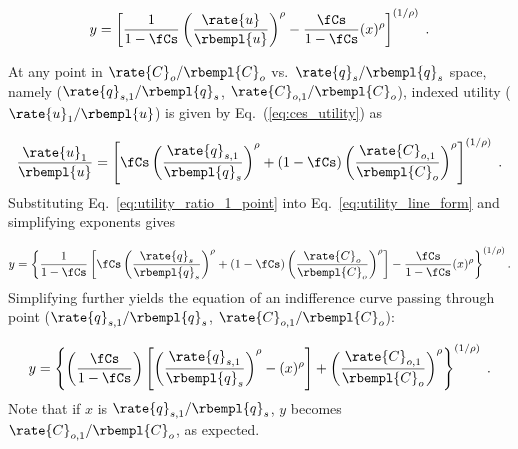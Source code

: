 \begin{equation} \label{eq:utility_line_form}
  y = \left[ \frac{1}{1 - \fCs} \left( \frac{\rate{u}}{\rbempl{u}} \right)^\rho 
            - \frac{\fCs}{1 - \fCs} (x)^\rho \right]^{(1/\rho)} \; .
\end{equation}

At any point in 
$\rate{C}_o/\rbempl{C}_o$ vs.\ $\rate{q}_s/\rbempl{q}_s$ space,
namely ($\rate{q}_{s,1}/\rbempl{q}_s$, $\rate{C}_{o,1}/\rbempl{C}_o$),
indexed utility ($\rate{u}_1/\rbempl{u}$) is given by Eq.~(\ref{eq:ces_utility}) as

\begin{equation} \label{eq:utility_ratio_1_point}
  \frac{\rate{u}_1}{\rbempl{u}} =
        \left[ \fCs \left( \frac{\rate{q}_{s,1}}{\rbempl{q}_s} \right)^\rho
        + (1-\fCs) \left( \frac{\rate{C}_{o,1}}{\rbempl{C}_o} \right)^\rho  \right]^{(1/\rho)} \; .
\end{equation}
%
Substituting Eq.~\ref{eq:utility_ratio_1_point} into Eq.~\ref{eq:utility_line_form} 
and simplifying exponents gives

\begin{equation}
  y = \left\{ \frac{1}{1 - \fCs} \left[ \fCs \left( \frac{\rate{q}_s}{\rbempl{q}_s} \right)^\rho 
        + (1-\fCs) \left( \frac{\rate{C}_o}{\rbempl{C}_o} \right)^\rho   \right] 
            - \frac{\fCs}{1 - \fCs} (x)^\rho \right\}^{(1/\rho)}  .
\end{equation}
%
Simplifying further yields
the equation of an indifference curve passing through point 
($\rate{q}_{s,1}/\rbempl{q}_s$, $\rate{C}_{o,1}/\rbempl{C}_o$):

\begin{equation} \label{eq:indiff_curve_eqn}
  y = \left\{ \left( \frac{\fCs}{1 - \fCs} \right) \left[ \left( \frac{\rate{q}_{s,1}}{\rbempl{q}_s} \right)^\rho 
                                                          - (x)^\rho  \right]
        + \left( \frac{\rate{C}_{o,1}}{\rbempl{C}_{o}} \right)^\rho \right\}^{(1/\rho)} \; .
\end{equation}
%
Note that if $x$ is $\rate{q}_{s,1}/\rbempl{q}_s$,
$y$ becomes $\rate{C}_{o,1}/\rbempl{C}_o$,
as expected.

